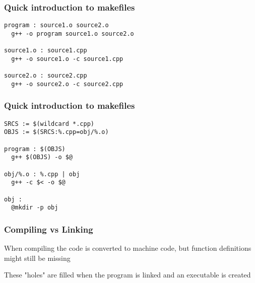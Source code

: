 \documentclass[14pt,a4paper,dvipsnames,usenames]{beamer}
\begin{document}
\begin{frame}[fragile]
  \frametitle{Quick introduction to makefiles}

  \begin{lstlisting}[language=gnumake,alsoletter={<,+},morekeywords={&<}]
program : source1.o source2.o
  g++ -o program source1.o source2.o

source1.o : source1.cpp
  g++ -o source1.o -c source1.cpp

source2.o : source2.cpp
  g++ -o source2.o -c source2.cpp
  \end{lstlisting}
\end{frame}

\begin{frame}[fragile]
  \frametitle{Quick introduction to makefiles}

  \begin{lstlisting}[language=gnumake,alsoletter={<,+},morekeywords={&<,SRCS,OBJS}]
SRCS := $(wildcard *.cpp)
OBJS := $(SRCS:%.cpp=obj/%.o)

program : $(OBJS)
  g++ $(OBJS) -o $@

obj/%.o : %.cpp | obj
  g++ -c $< -o $@

obj :
  @mkdir -p obj
  \end{lstlisting}
\end{frame}

\begin{frame}[fragile]
  \frametitle{Compiling vs Linking}

  When compiling the code is converted to machine code, but function definitions might still be missing

  \vspace{1em}
  These "holes" are filled when the program is linked and an executable is created
  
\end{frame}
\end{document}

